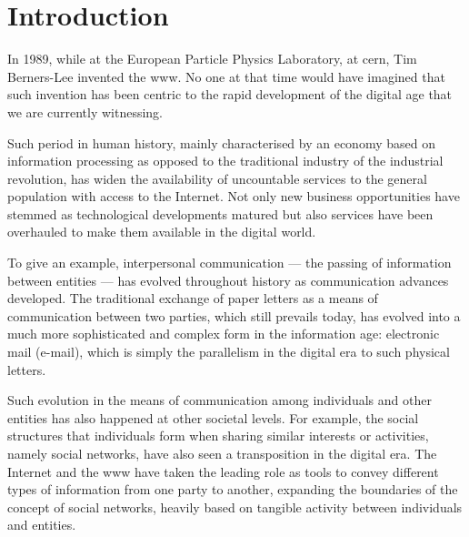 \documentclass[showtrims]{kthesis}
\begin{document}
\frontmatter
% 
\clearpage
\tableofcontents
\mainmatter
\chapter{Introduction}
In 1989, while at the European Particle Physics Laboratory, at \ac{cern}, Tim Berners-Lee 
invented the \Ac{www}. No one at that time would have imagined that such invention 
has been centric to the rapid development of the digital age that we are currently 
witnessing.

Such period in human history, mainly characterised by an economy based on information 
processing as opposed to the traditional industry of the industrial revolution, 
has widen the availability of uncountable services to the general population with 
access to the Internet. Not only new business opportunities have stemmed as technological 
developments matured but also services have been overhauled to make them available 
in the digital world.

To give an example, interpersonal communication --- the passing of information between 
entities --- has evolved throughout history as communication advances developed. 
The traditional exchange of paper letters as a means of communication between two 
parties, which still prevails today, has evolved into a much more sophisticated 
and complex form in the information age: electronic mail (e-mail), which is simply 
the parallelism in the digital era to such physical letters.

Such evolution in the means of communication among individuals and other entities 
has also happened at other societal levels. For example, the social structures that 
individuals form when sharing similar interests or activities, namely social networks, 
have also seen a transposition in the digital era. The Internet and the \ac{www} 
have taken the leading role as tools to convey different types of information from 
one party to another, expanding the boundaries of the concept of social networks, 
heavily based on tangible activity between individuals and entities.
\end{document}
